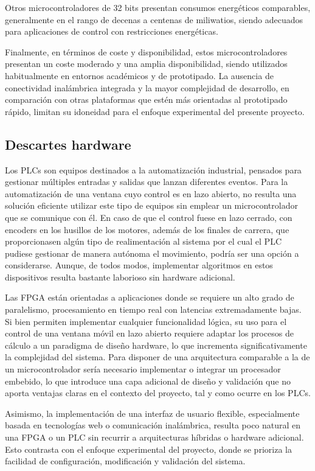 Otros microcontroladores de 32 bits presentan consumos energéticos comparables, generalmente en el rango de decenas a centenas de miliwatios, siendo adecuados para aplicaciones de control con restricciones energéticas.

Finalmente, en términos de coste y disponibilidad, estos microcontroladores presentan un coste moderado y una amplia disponibilidad, siendo utilizados habitualmente en entornos académicos y de prototipado. La ausencia de conectividad inalámbrica integrada y la mayor complejidad de desarrollo, en comparación con otras plataformas que estén más orientadas al prototipado rápido, limitan su idoneidad para el enfoque experimental del presente proyecto.


\subsection{Descartes hardware}
Los PLCs son equipos destinados a la automatización industrial, pensados para gestionar múltiples entradas y salidas que lanzan diferentes eventos. Para la automatización de una ventana cuyo control es en lazo abierto, no resulta una solución eficiente utilizar este tipo de equipos sin emplear un microcontrolador que se comunique con él. En caso de que el control fuese en lazo cerrado, con encoders en los husillos de los motores, además de los finales de carrera, que proporcionasen algún tipo de realimentación al sistema por el cual el PLC pudiese gestionar de manera autónoma el movimiento, podría ser una opción a considerarse. Aunque, de todos modos, implementar algoritmos en estos dispositivos resulta bastante laborioso sin hardware adicional.

Las FPGA están orientadas a aplicaciones donde se requiere un alto grado de paralelismo, procesamiento en tiempo real con latencias extremadamente bajas. Si bien permiten implementar cualquier funcionalidad lógica, su uso para el control de una ventana móvil en lazo abierto requiere adaptar los procesos de cálculo a un paradigma de diseño hardware, lo que incrementa significativamente la complejidad del sistema. Para disponer de una arquitectura comparable a la de un microcontrolador sería necesario implementar o integrar un procesador embebido, lo que introduce una capa adicional de diseño y validación que no aporta ventajas claras en el contexto del proyecto, tal y como ocurre en los PLCs.

Asimismo, la implementación de una interfaz de usuario flexible, especialmente basada en tecnologías web o comunicación inalámbrica, resulta poco natural en una FPGA o un PLC sin recurrir a arquitecturas híbridas o hardware adicional. Esto contrasta con el enfoque experimental del proyecto, donde se prioriza la facilidad de configuración, modificación y validación del sistema.


